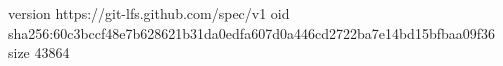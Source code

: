 version https://git-lfs.github.com/spec/v1
oid sha256:60c3bccf48e7b628621b31da0edfa607d0a446cd2722ba7e14bd15bfbaa09f36
size 43864
